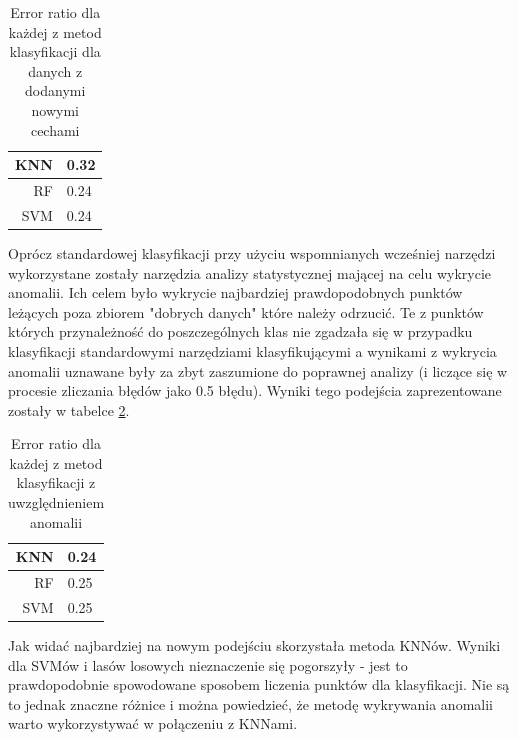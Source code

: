 \documentclass[a4paper]{report}
\begin{document}
\begin{table}[!htp]
    \centering
    \begin{tabular}{|r|l|}
      \hline 
      KNN & 0.32 \\
      \hline
      RF & 0.24 \\
      \hline
      SVM & 0.24 \\
      \hline
    \end{tabular} 
    
    \caption{Error ratio dla każdej z metod klasyfikacji dla danych z dodanymi nowymi cechami}
    \label{results2}
\end{table}

Oprócz standardowej klasyfikacji przy użyciu wspomnianych wcześniej narzędzi wykorzystane zostały narzędzia analizy statystycznej mającej na celu wykrycie anomalii. Ich celem było wykrycie najbardziej prawdopodobnych punktów leżących poza zbiorem "dobrych danych" które należy odrzucić. Te z punktów których przynależność do poszczególnych klas nie zgadzała się w przypadku klasyfikacji standardowymi narzędziami klasyfikującymi a wynikami z wykrycia anomalii uznawane były za zbyt zaszumione do poprawnej analizy (i liczące się w procesie zliczania błędów jako 0.5 błędu). Wyniki tego podejścia zaprezentowane zostały w tabelce \ref{results3}.

\begin{table}[!htp]
    \centering
    \begin{tabular}{|r|l|}
      \hline 
      KNN & 0.24 \\
      \hline
      RF & 0.25 \\
      \hline
      SVM & 0.25 \\
      \hline
    \end{tabular} 
    
    \caption{Error ratio dla każdej z metod klasyfikacji z uwzględnieniem anomalii}
    \label{results3}
\end{table}

Jak widać najbardziej na nowym podejściu skorzystała metoda KNNów. Wyniki dla SVMów i lasów losowych nieznaczenie się pogorszyły - jest to prawdopodobnie spowodowane sposobem liczenia punktów dla klasyfikacji. Nie są to jednak znaczne różnice i można powiedzieć, że metodę wykrywania anomalii warto wykorzystywać w połączeniu z KNNami.
\end{document}

